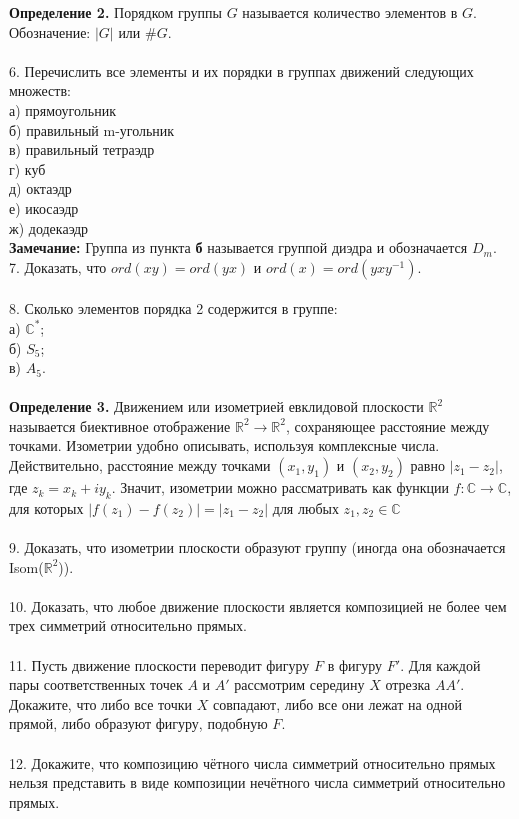 \documentclass[12pt]{article}
\begin{document}
\textbf{Определение 2. }Порядком группы $G$ называется количество элементов в $G$. Обозначение: $|G|$ или $\#G$.\\
\\
6. Перечислить все элементы и их порядки в группах движений следующих множеств:\\
а) прямоугольник\\
б) правильный m-угольник\\
в) правильный тетраэдр\\
г) куб\\
д) октаэдр\\
е) икосаэдр\\
ж) додекаэдр\\
\textbf{Замечание:} Группа из пункта \textbf{б} называется группой диэдра и обозначается $D_m$.
\\
7. Доказать, что $ord(xy) = ord(yx)$ и $ord(x) = ord(yxy^{-1})$.\\
\\
8. Сколько элементов порядка 2 содержится в группе:\\
а) $\mathbb{C}^*$;\\
б) $S_5$;\\
в) $A_5$.\\
\\

\textbf{Определение 3. } Движением или изометрией евклидовой плоскости $\mathbb{R}^2$ называется биективное отображение $\mathbb{R}^2 \to \mathbb{R}^2$, сохраняющее расстояние между точками. Изометрии удобно описывать, используя комплексные числа. Действительно, расстояние между точками $(x_1, y_1)$ и $(x_2, y_2)$ равно $|z_1 - z_2|$, где $z_k = x_k + iy_k$. Значит, изометрии можно рассматривать как функции $f: \mathbb{C} \to \mathbb{C}$, для которых $|f(z_1) - f(z_2)| = |z_1 - z_2|$ для любых $z_1, z_2 \in \mathbb{C}$\\
\\
9. Доказать, что изометрии плоскости образуют группу (иногда она обозначается Isom($\mathbb{R}^2$)).\\
\\
10. Доказать, что любое движение плоскости является композицией не более чем трех симметрий относительно прямых. \\
\\
11. Пусть движение плоскости переводит фигуру $F$ в фигуру $F'$. Для каждой пары соответственных точек $A$ и $A'$ рассмотрим середину $X$ отрезка $AA'$. Докажите, что либо все точки $X$ совпадают, либо все они лежат на одной прямой, либо образуют фигуру, подобную $F$.\\
\\
12. Докажите, что композицию чётного числа симметрий относительно прямых нельзя представить в виде композиции нечётного числа симметрий относительно прямых. 
\end{document}
